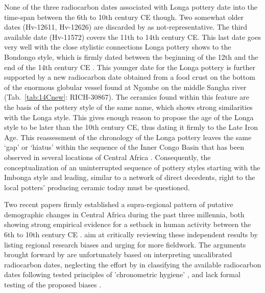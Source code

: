 \documentclass[smallextended,natbib]{svjour3}       %
\begin{document}
None of the three radiocarbon dates associated with Longa pottery date into the time-span between the 6th to 10th century CE though. Two somewhat older dates (Hv-12611, Hv-12626) are discarded by \citet[127--128 Tab. 53]{Wotzka.1995} as not-representative. The third available date (Hv-11572) covers the 11th to 14th century CE. This last date goes very well with the close stylistic connections Longa pottery shows to the Bondongo style, which is firmly dated between the beginning of the 12th and the end of the 14th century CE \citep[Fig.~\ref{fig:chrono}; S1; Tab.~S1;][138 Tab.~58]{Wotzka.1995}. This younger date for the Longa pottery is further supported by a new radiocarbon date obtained from a food crust on the bottom of the enormous globular vessel found at Ngombe on the middle Sangha river (Tab.~\ref{tab:14Cnew}: RICH-30867). The ceramics found within this feature are the basis of the pottery style of the same name, which shows strong similarities with the Longa style. This gives enough reason to propose the age of the Longa style to be later than the 10th century CE, thus dating it firmly to the Late Iron Age. This reassessment of the chronology of the Longa pottery leaves the same ‘gap’ or ‘hiatus’ within the sequence of the Inner Congo Basin that has been observed in several locations of Central Africa \citep{deSaulieu.2021a,Seidensticker.2021}. Consequently, the conceptualization of an uninterrupted sequence of pottery styles starting with the Imbonga style and leading, similar to a network of direct decedents, right to the local potters’ producing ceramic today \citep[65, 221, 274, 285]{Wotzka.1995} must be questioned.

Two recent papers firmly established a supra-regional pattern of putative demographic changes in Central Africa during the past three millennia, both showing strong empirical evidence for a setback in human activity between the 6th to 10th century CE \citep{deSaulieu.2021a,Seidensticker.2021}. \citet{Clist.2023a} aim at critically reviewing these independent results by listing regional research biases and urging for more fieldwork. The arguments brought forward by \citet{Clist.2023a} are unfortunately based on interpreting uncalibrated radiocarbon dates, neglecting the effort by \citet[9, Tab.~S1]{Seidensticker.2021} in classifying the available radiocarbon dates following tested principles of 'chronometric hygiene' \citep{Spriggs.1989,Spriggs.1993,Pettitt.2003,Napolitano.2019}, and lack formal testing of the proposed biases \citep[cf.][]{Galletti.2013,Gillespie.2016,Jones.2019,AlwiMuttaqin.2019,Boemke.2023}.
\end{document}
